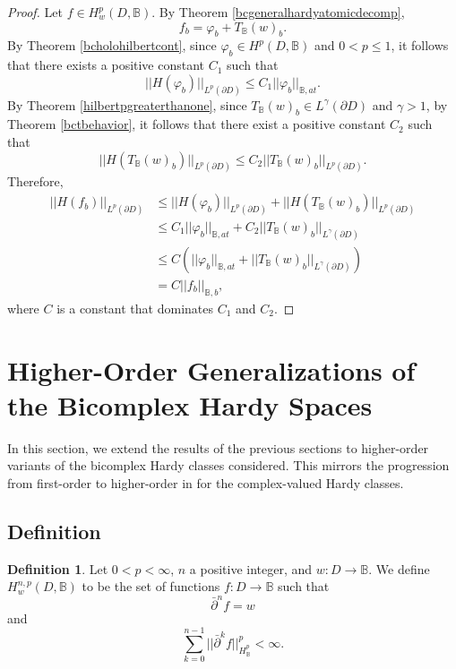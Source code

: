 \documentclass[suppldata]{interact}
\theoremstyle{plain}%
\theoremstyle{definition}
\newtheorem{deff}[theorem]{Definition}
\theoremstyle{remark}
\newcommand{\p}{\partial}
\newcommand{\dbar}{\bar\partial}
\newcommand{\bc}{\mathbb{B}}
\begin{document}
\begin{proof}
Let $f \in H^p_w(D, \bc)$. By Theorem \ref{bcgeneralhardyatomicdecomp}, 
\[
    f_b = \varphi_b + T_\bc(w)_b.
\]
By Theorem \ref{bcholohilbertcont}, since $\varphi_b \in H^p(D, \bc)$ and $0 < p \leq 1$, it follows that there exists a positive constant $C_1$ such that 
\[
    ||H(\varphi_b)||_{L^p(\p D)} \leq C_1 ||\varphi_b||_{\bc,at}.
\]
By Theorem \ref{hilbertpgreaterthanone}, since $T_\bc(w)_b \in L^\gamma(\p D)$ and $\gamma > 1$, by Theorem \ref{bctbehavior}, it follows that there exist a positive constant $C_2$ such that 
\[
    ||H(T_\bc(w)_b)||_{L^p(\p D)} \leq C_2 ||T_\bc(w)_b||_{L^p(\p D)}.
\]
Therefore, 
\begin{align*}
    ||H(f_b)||_{L^p(\p D)} 
    &\leq ||H(\varphi_b)||_{L^p(\p D)} + ||H(T_\bc(w)_b)||_{L^p(\p D)}\\
    &\leq C_1 ||\varphi_b||_{\bc,at} + C_2 ||T_\bc(w)_b||_{L^\gamma(\p D)} \\
    &\leq C\left( ||\varphi_b||_{\bc,at} +  ||T_\bc(w)_b||_{L^\gamma(\p D)} \right)\\
    &= C||f_b||_{\bc,b},
\end{align*}
where $C$ is a constant that dominates $C_1$ and $C_2$. 

\end{proof}







\section{Higher-Order Generalizations of the Bicomplex Hardy Spaces}\label{higherordersection}

In this section, we extend the results of the previous sections to higher-order variants of the bicomplex Hardy classes considered. This mirrors the progression from first-order to higher-order in \cite{WB} for the complex-valued Hardy classes. 

\subsection{Definition}

\begin{deff}
    Let $0 < p < \infty$, $n$ a positive integer, and $w : D\to\bc$. We define $H^{n,p}_{w}(D, \bc)$ to be the set of functions $f: D \to\bc$ such that 
    \[
        \dbar^n f = w
    \]
    and 
    \[
        \sum_{k=0}^{n-1} ||\dbar^k f ||^p_{H^p_\bc} < \infty. 
    \]
\end{deff}
\end{document}
